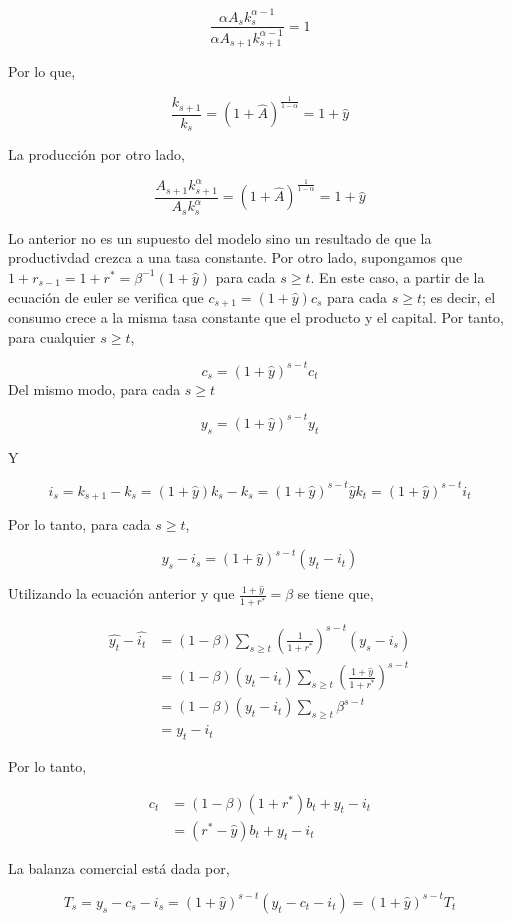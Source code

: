 \documentclass[]{article}
\begin{document}
\[
\frac{\alpha A_s k_s^{\alpha-1}}{\alpha A_{s+1} k_{s+1}^{\alpha-1}} = 1
\]

Por lo que,

\[
\frac{k_{s+1}}{k_s} = (1 + \hat{A})^{\frac{1}{1-\alpha}} = 1 + \hat{y}
\]

La producción por otro lado,

\[
\frac{A_{s+1}k_{s+1}^{\alpha}}{A_s k_{s}^{\alpha}} = (1 + \hat{A})^{\frac{1}{1-\alpha}} = 1 + \hat{y}
\]

Lo anterior no es un supuesto del modelo sino un resultado de que la
productivdad crezca a una tasa constante. Por otro lado, supongamos que
\(1+ r_{s-1} = 1+r^* = \beta^{-1}(1+ \hat{y})\) para cada \(s \geq t\).
En este caso, a partir de la ecuación de euler se verifica que
\(c_{s+1} = (1+\hat{y})c_s\) para cada \(s \geq t\); es decir, el
consumo crece a la misma tasa constante que el producto y el capital.
Por tanto, para cualquier \(s \geq t\),

\[
c_s = (1 + \hat{y})^{s-t}c_t
\] Del mismo modo, para cada \(s \geq t\)

\[
y_s = (1 + \hat{y})^{s-t}y_t
\]

Y

\[
i_s = k_{s+1} - k_s = (1+\hat{y})k_s-k_s = (1+\hat{y})^{s-t}\hat{y}k_t = (1+\hat{y})^{s-t}i_t 
\]

Por lo tanto, para cada \(s \geq t\),

\[
y_s - i_s = (1 + \hat{y})^{s-t}(y_t-i_t)
\]

Utilizando la ecuación anterior y que
\(\frac{1+\hat{y}}{1+r^*} = \beta\) se tiene que,

\[
\begin{align}
\hat{y_t} -\hat{i_t} &= (1-\beta)\sum_{s \geq t} \left(\frac{1}{1+r^*}\right)^{s-t}(y_s - i_s) \\
&= (1-\beta)(y_t - i_t)\sum_{s\geq t} \left(\frac{1 + \hat{y}}{1+r^*}\right)^{s-t} \\
&= (1-\beta)(y_t - i_t)\sum_{s\geq t}\beta^{s-t} \\
&= y_t - i_t
\end{align}
\]

Por lo tanto,

\[
\begin{align}
c_t &= (1-\beta)(1+r^*)b_t + y_t - i_t\\
&=(r^*-\hat{y})b_t + y_t - i_t
\end{align}
\]

La balanza comercial está dada por,

\[
T_s = y_s - c_s - i_s = (1+\hat{y})^{s-t}(y_t-c_t-i_t) = (1+\hat{y})^{s-t}T_t
\]
\end{document}
